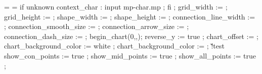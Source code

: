 {   \edef\@@FLOFrulethickness{\the\scratchdimen}%
   \scratchdimen=\@@FLOLrulethickness
   \edef\@@FLOLrulethickness{\the\scratchdimen}%
   \ifdim\@@FLOLradius<2.5\scratchdimen
     \scratchdimen=2.5\scratchdimen
     \edef\@@FLOLradius{\the\scratchdimen}%
     \ifdim\@@FLOLradius>\@@FLOWdx
       \scratchdimen=\@@FLOWdx
       \edef\@@FLOLradius{\the\scratchdimen}%
     \fi
     \ifdim\@@FLOLradius>\@@FLOWdy
       \scratchdimen=\@@FLOWdy
       \edef\@@FLOLradius{\the\scratchdimen}%
     \fi
   \else
     \scratchdimen=\@@FLOLradius
     \edef\@@FLOLradius{\the\scratchdimen}%
   \fi
   \processaction %
     [\@@FLOWoffset]
     [      \v!none=>\scratchdimen=-2.5\scratchdimen,
         \v!overlay=>\scratchdimen=-2.5\scratchdimen,
        \v!standard=>\scratchdimen=\scratchdimen,
         \s!unknown=>\scratchdimen=\@@FLOWoffset,
         \s!default=>\scratchdimen=-2.5\scratchdimen]%
   \edef\@@FLOW@@offset{\the\scratchdimen}%
   \forgetall
   \offinterlineskip
   \resetMPdrawing
   \doglobal\newcounter\FLOWcomment
   \startMPdrawing
     if unknown context_char : input mp-char.mp ; fi ;
     grid_width             := \FLOWgridwidth ;
     grid_height            := \FLOWgridheight ;
     shape_width            := \FLOWshapewidth ;
     shape_height           := \FLOWshapeheight ;
     connection_line_width  := \@@FLOLrulethickness ;
     connection_smooth_size := \@@FLOLradius ;
     connection_arrow_size  := \@@FLOLradius ;
     connection_dash_size   := \@@FLOLradius ;
     begin_chart(0,\FLOWwidth,\FLOWheight);
     reverse_y := true ;
     chart_offset := \@@FLOW@@offset ;
   \stopMPdrawing
   \doifelsenothing\@@FLOWbackgroundcolor
     {\startMPdrawing
      chart_background_color := white ;
      \stopMPdrawing}
     {\startMPdrawing
      chart_background_color := \MPcolor{\@@FLOWbackgroundcolor} ;
      \stopMPdrawing}%
   \doif\@@FLOWoption\v!test
     {\startMPdrawing
        show_con_points := true ;
        show_mid_points := true ;
        show_all_points := true ;
      \stopMPdrawing}%
}
